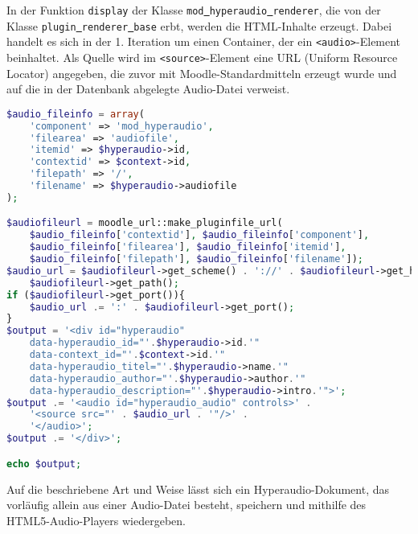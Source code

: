 In der Funktion \texttt{display} der Klasse \mbox{\texttt{mod\underline{{ }}hyperaudio\underline{{ }}renderer}}, die von der Klasse \mbox{\texttt{plugin\underline{{ }}renderer\underline{{ }}base}} erbt, werden die HTML-Inhalte erzeugt. Dabei handelt es sich in der 1. Iteration um einen Container, der ein \texttt{<audio>}-Element beinhaltet. Als Quelle wird im \texttt{<source>}-Element eine URL (Uniform Resource Locator) angegeben, die zuvor mit Moodle-Standardmitteln erzeugt wurde und auf die in der Datenbank abgelegte Audio-Datei verweist.

\begin{lstlisting}[language=php,
             linewidth=\textwidth,
             caption={Ausschnitt der \textbf{renderer.php} in der 1. Iteration},
             label={lst:it1:renderer}]
$audio_fileinfo = array(
    'component' => 'mod_hyperaudio',
    'filearea' => 'audiofile',
    'itemid' => $hyperaudio->id,
    'contextid' => $context->id,
    'filepath' => '/',
    'filename' => $hyperaudio->audiofile
);

$audiofileurl = moodle_url::make_pluginfile_url(
    $audio_fileinfo['contextid'], $audio_fileinfo['component'],
    $audio_fileinfo['filearea'], $audio_fileinfo['itemid'],
    $audio_fileinfo['filepath'], $audio_fileinfo['filename']);
$audio_url = $audiofileurl->get_scheme() . '://' . $audiofileurl->get_host() .
    $audiofileurl->get_path();
if ($audiofileurl->get_port()){
    $audio_url .= ':' . $audiofileurl->get_port();
}
$output = '<div id="hyperaudio" 
    data-hyperaudio_id="'.$hyperaudio->id.'"
    data-context_id="'.$context->id.'"
    data-hyperaudio_titel="'.$hyperaudio->name.'"
    data-hyperaudio_author="'.$hyperaudio->author.'"
    data-hyperaudio_description="'.$hyperaudio->intro.'">';
$output .= '<audio id="hyperaudio_audio" controls>' .
    '<source src="' . $audio_url . '"/>' .
    '</audio>';
$output .= '</div>';

echo $output;
\end{lstlisting}

Auf die beschriebene Art und Weise lässt sich ein Hyperaudio-Dokument, das vorläufig allein aus einer Audio-Datei besteht, speichern und mithilfe des HTML5-Audio-Players wiedergeben.


